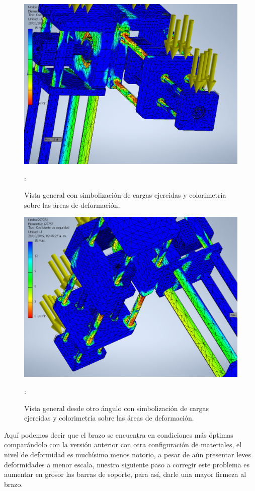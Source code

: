 \documentclass[11pt,a4paper,oldfontcommands,oneside]{memoir}
\begin{document}
\begin{flushleft}
\begin{figure}
\begin{center}
\includegraphics[scale=.55]{cb3.png} 
\end{center}
\caption{Vista general con simbolización de cargas ejercidas y colorimetría sobre las áreas de deformación.}
\label{tabla14}:
\end{figure}

\begin{figure}
\begin{center}
\includegraphics[scale=.55]{cb4.png} 
\end{center}
\caption{Vista general desde otro ángulo con simbolización de cargas ejercidas y colorimetría sobre las áreas de deformación.}
\label{tabla15}:
\end{figure}

Aquí podemos decir que el brazo se encuentra en condiciones más óptimas comparándolo con la versión anterior con otra configuración de materiales, el nivel de deformidad es muchísimo menos notorio, a pesar de aún presentar leves deformidades a menor escala, nuestro siguiente paso a corregir este problema es aumentar en grosor las barras de soporte, para así, darle una mayor firmeza al brazo.

\end{flushleft}

\vspace{2cm}
\hfill



\end{document}
